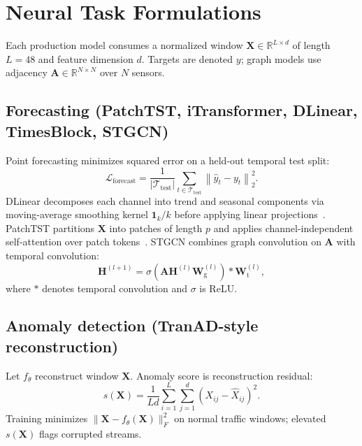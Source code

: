 \section{Neural Task Formulations}
\label{sec:neural_formulations}

Each production model consumes a normalized window $\mathbf{X}\in\mathbb{R}^{L\times d}$ of length $L=48$ and feature dimension $d$. Targets are denoted $y$; graph models use adjacency $\mathbf{A}\in\mathbb{R}^{N\times N}$ over $N$ sensors.

\subsection{Forecasting (PatchTST, iTransformer, DLinear, TimesBlock, STGCN)}

Point forecasting minimizes squared error on a held-out temporal test split:
\begin{equation}
\label{eq:forecast_loss}
\mathcal{L}_{\mathrm{forecast}} = \frac{1}{|\mathcal{T}_{\mathrm{test}}|}\sum_{t\in\mathcal{T}_{\mathrm{test}}}\left\|\hat{y}_t - y_t\right\|_2^2 .
\end{equation}
DLinear decomposes each channel into trend and seasonal components via moving-average smoothing kernel $\mathbf{1}_k/k$ before applying linear projections~\cite{zeng2023transformers}. PatchTST partitions $\mathbf{X}$ into patches of length $p$ and applies channel-independent self-attention over patch tokens~\cite{nie2023patchtst}. STGCN combines graph convolution on $\mathbf{A}$ with temporal convolution:
\begin{equation}
\label{eq:stgcn}
\mathbf{H}^{(l+1)} = \sigma\!\left(\mathbf{A}\mathbf{H}^{(l)}\mathbf{W}^{(l)}_{\mathrm{g}}\right) * \mathbf{W}^{(l)}_{\mathrm{t}},
\end{equation}
where $*$ denotes temporal convolution and $\sigma$ is ReLU.

\subsection{Anomaly detection (TranAD-style reconstruction)}

Let $f_\theta$ reconstruct window $\mathbf{X}$. Anomaly score is reconstruction residual:
\begin{equation}
\label{eq:tranad_score}
s(\mathbf{X}) = \frac{1}{Ld}\sum_{i=1}^{L}\sum_{j=1}^{d}\left(X_{ij} - \hat{X}_{ij}\right)^2 .
\end{equation}
Training minimizes $\|\mathbf{X} - f_\theta(\mathbf{X})\|_F^2$ on normal traffic windows; elevated $s(\mathbf{X})$ flags corrupted streams.

